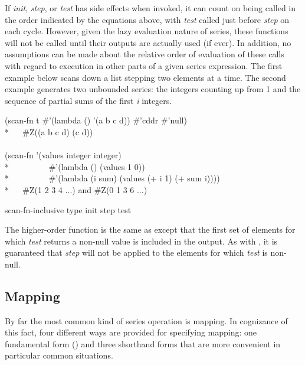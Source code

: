 \begin{defun}[Function]
If \emph{init}, \emph{step}, or \emph{test} has side effects when
invoked, it can count on being called in the order indicated by the
equations above, with \emph{test} called just before \emph{step} on each
cycle.  However, given the lazy evaluation nature of series, these
functions will not be called until their outputs are actually used (if
ever).  In addition, no assumptions can be made about the relative order of
evaluation of these calls with regard to execution in other parts of a
given series expression.  The first example below scans down a list
stepping two elements at a time.  The second example generates two unbounded
series: the integers counting up from 1 and the sequence of partial
sums of the first \emph{i} integers.
\begin{lisp}
(scan-fn t \#'(lambda () '(a b c d)) \#'cddr \#'null) \\*
~~{\EV} \#Z((a b c d) (c d)) \\
\\
(scan-fn '(values integer integer) \\*
~~~~~~~~~\#'(lambda () (values 1 0)) \\*
~~~~~~~~~\#'(lambda (i sum) (values (+ i 1) (+ sum i)))) \\*
~~{\EV} \#Z(1 2 3 4 ...) {\rm and} \#Z(0 1 3 6 ...)
\end{lisp}
\end{defun}

\begin{defun}[Function]
scan-fn-inclusive type init step test

The higher-order function  is the same as 
 except that the first set of elements for which \emph{test}
returns a non-null value is included in the output.  As with
, it is guaranteed that \emph{step} will not be applied to the
elements for which \emph{test} is non-null.
\end{defun}

\subsection{Mapping}

By far the most common kind of series operation is mapping.  In cognizance
of this fact, four different ways are provided for specifying mapping:  one
fundamental form () and three shorthand forms that are more
convenient in particular common situations.

